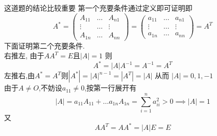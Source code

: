 \documentclass[12pt, a4paper, oneside, UTF8]{ctexbook}
\begin{document}
\begin{enumerate}[label=\arabic*.,start=9]
    \begin{solution}
    {\color{red} 这道题的结论比较重要} 第一个充要条件通过定义即可证明即
    $$
    A^{*}=\begin{pmatrix}
        A_{11} &\ldots & A_{n1} \\
        \vdots &\ldots & \vdots \\
        A_{1n} &\ldots & A_{nn} 
    \end{pmatrix} = \begin{pmatrix}
        a_{11} &\ldots & a_{n1} \\
        \vdots &\ldots & \vdots \\
        a_{1n} &\ldots & a_{nn} 
    \end{pmatrix} = A^{T}
    $$
    下面证明第二个充要条件. \\
    右推左, 由于$AA^T=E$且$\left|A\right|=1$ 则
    $$
    A^{*}=\left|A\right|A^{-1}=A^{-1}=A^{T}
    $$
    左推右,由$A^{*}=A^{T}$则$\left|A^*\right|=\left|A\right|^{n-1}=\left|A^{T}\right|=\left|A\right|$ 从而
    $\left|A\right|=0,1,-1$ \\
    由于$A\neq O$,不妨设$a_11\neq 0$,按第一行展开有
    $$
    \left|A\right| = a_{11}A_{11} + \ldots a_{1n}A_{1n} = \sum_{i=1}^{n}a_{ii}^2 > 0 \implies \left|A\right| = 1
    $$
    又
    $$
    AA^{T}=AA^*=\left|A\right|E=E
    $$
    \end{solution}
\end{enumerate}
\end{document}
